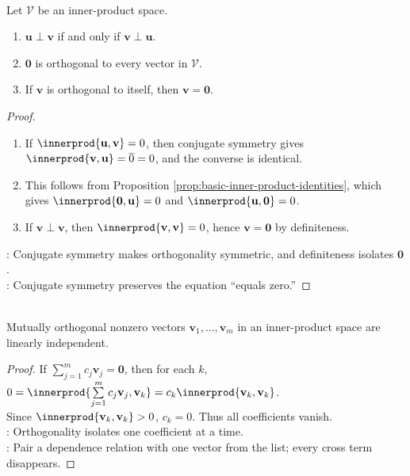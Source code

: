 \begin{proposition} \label{prop:orthogonality-and-zero} \\
Let $\mathcal{V}$ be an inner-product space.
\begin{enumerate}[label=\roman*.]
\setlength{\itemsep}{0pt}
\item $\mathbf{u}\perp\mathbf{v}$ if and only if $\mathbf{v}\perp\mathbf{u}$.
\item $\mathbf{0}$ is orthogonal to every vector in $\mathcal{V}$.
\item If $\mathbf{v}$ is orthogonal to itself, then $\mathbf{v}=\mathbf{0}$.
\end{enumerate}
\begin{proof}
\begin{enumerate}[label=(\roman*)]
\setlength{\itemsep}{0pt}
\item If $\innerprod{\mathbf{u},\mathbf{v}}=0$, then conjugate symmetry gives $\innerprod{\mathbf{v},\mathbf{u}}=\overline{0}=0$, and the converse is identical.
\item This follows from Proposition \ref{prop:basic-inner-product-identities}, which gives $\innerprod{\mathbf{0},\mathbf{u}}=0$ and $\innerprod{\mathbf{u},\mathbf{0}}=0$.
\item If $\mathbf{v}\perp\mathbf{v}$, then $\innerprod{\mathbf{v},\mathbf{v}}=0$, hence $\mathbf{v}=\mathbf{0}$ by definiteness.
\end{enumerate}
: Conjugate symmetry makes orthogonality symmetric, and definiteness isolates $\mathbf{0}$.\\
: Conjugate symmetry preserves the equation ``equals zero.''
\end{proof}
\end{proposition}

\begin{proposition} \label{prop:mutually-orthogonal-nonzero-vectors-independent} \\
Mutually orthogonal nonzero vectors $\mathbf{v}_1,\ldots,\mathbf{v}_m$ in an inner-product space are linearly independent.
\begin{proof}
If $\sum\limits_{j=1}^m c_j\mathbf{v}_j=\mathbf{0}$, then for each $k$, $0=\innerprod{\sum\limits_{j=1}^m c_j\mathbf{v}_j,\mathbf{v}_k} =c_k\innerprod{\mathbf{v}_k,\mathbf{v}_k}$.\\
Since $\innerprod{\mathbf{v}_k,\mathbf{v}_k}>0$, $c_k=0$. Thus all coefficients vanish.\\
: Orthogonality isolates one coefficient at a time.\\
: Pair a dependence relation with one vector from the list; every cross term disappears.
\end{proof}
\end{proposition}
